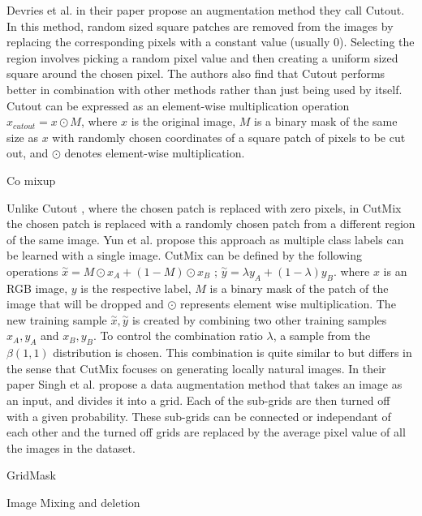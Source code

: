 Devries et al. in their paper \cite{devriesImprovedRegularizationConvolutional2017} propose an augmentation method they call Cutout. In this method, random sized square patches are removed from the images by replacing the corresponding pixels with a constant value (usually 0). Selecting the region involves picking a random pixel value and then creating a uniform sized square around the chosen pixel. The authors also find that Cutout performs better in combination with other methods rather than just being used by itself. Cutout can be expressed as an element-wise multiplication operation $x_{cutout} = x \odot M$,
where $x$ is the original image, $M$ is a binary mask of the same size as $x$ with randomly chosen coordinates of a square patch of pixels to be cut out, and $\odot$ denotes element-wise multiplication.

Co mixup

Unlike Cutout \cite{devriesImprovedRegularizationConvolutional2017}, where the chosen patch is replaced with zero pixels, in CutMix \cite{yunCutMixRegularizationStrategy2019} the chosen patch is replaced with a randomly chosen patch from a different region of the same image. Yun et al. propose this approach as multiple class labels can be learned with a single image.
CutMix can be defined by the following operations $\overset{\sim}x = M \odot x_{A} + (1-M) \odot x_{B}$ ; $\overset{\sim}y = \lambda y_{A}+ (1- \lambda)y_{B}$. where $x$ is an RGB image, $y$ is the respective label, $M$ is a binary mask of the patch of the image that will be dropped and $\odot$ represents element wise multiplication. The new training sample $\overset{\sim}x , \overset{\sim}y$ is created by combining two other training samples $x_{A}, y_{A}$ and $x_{B} , y_{B}$. To control the combination ratio $\lambda$, a sample from the $\beta(1,1)$ distribution is chosen. This combination is quite similar to \cite{zhangMixupEmpiricalRisk2018} but differs in the sense that CutMix focuses on generating locally natural images.
\nolinebreak
In their paper Singh et al. \cite{singhHideandSeekDataAugmentation2018} propose a data augmentation method that takes an image as an input, and divides it into a grid. Each of the sub-grids are then turned off with a given probability. These sub-grids can be connected or independant of each other and the turned off grids are replaced by the average pixel value of all the images in the dataset.

GridMask

Image Mixing and deletion

